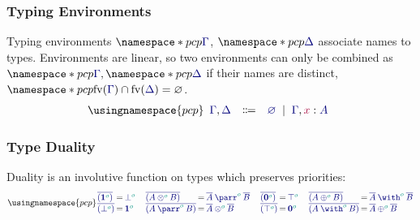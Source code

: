 \subsubsection*{Typing Environments}
\label{sec:pcp-environments}
Typing environments $\pcp{\ty{\Gamma}}$, $\pcp{\ty{\Delta}}$ associate names to types. Environments are linear, so two environments can only be combined as $\pcp{\ty{\Gamma}}, \pcp{\ty{\Delta}}$ if their names are distinct, \ie $\pcp{\fv(\ty{\Gamma})\cap\fv(\ty{\Delta})=\varnothing}$.
\[
  \usingnamespace{pcp}
  \begin{array}{lcl}
    \ty{\Gamma}, \ty{\Delta}
    & \Coloneqq & \ty{\emptyenv}
      \sep        \ty{\Gamma}, \tmty{x}{A}
  \end{array}
\]

\subsubsection*{Type Duality}
\label{sec:pcp-duality}
Duality is an involutive function on types which preserves priorities:
\[
  \usingnamespace{pcp}
  \setlength{\arraycolsep}{1pt}
  \begin{array}{lcl}
    \ty{\co{(\tyone[\cs{o}])}} & = & \ty{\tybot[\cs{o}]} \\
    \ty{\co{(\tybot[\cs{o}])}} & = & \ty{\tyone[\cs{o}]}
  \end{array}
  \quad
  \begin{array}{lcl}
    \ty{\co{(\tytens[\cs{o}]{A}{B})}} & = & \ty{\typarr[\cs{o}]{\co{A}}{\co{B}}} \\
    \ty{\co{(\typarr[\cs{o}]{A}{B})}} & = & \ty{\tytens[\cs{o}]{\co{A}}{\co{B}}}
  \end{array}
  \quad
  \begin{array}{lcl}
    \ty{\co{(\tynil[\cs{o}])}} & = & \ty{\tytop[\cs{o}]} \\
    \ty{\co{(\tytop[\cs{o}])}} & = & \ty{\tynil[\cs{o}]}
  \end{array}
  \quad
  \begin{array}{lcl}
    \ty{\co{(\typlus[\cs{o}]{A}{B})}} & = & \ty{\tywith[\cs{o}]{\co{A}}{\co{B}}} \\
    \ty{\co{(\tywith[\cs{o}]{A}{B})}} & = & \ty{\typlus[\cs{o}]{\co{A}}{\co{B}}}
  \end{array}
\]

